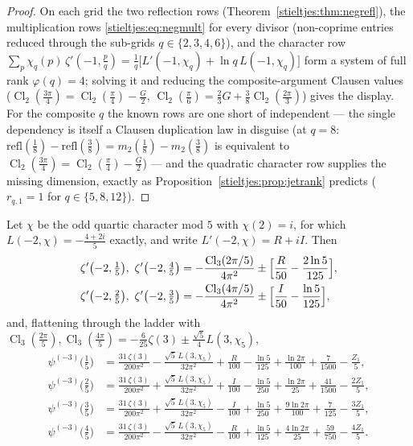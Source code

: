 \begin{proof}
On each grid the two reflection rows
(Theorem~\ref{stieltjes:thm:negrefl}), the multiplication rows
\eqref{stieltjes:eq:negmult} for every divisor (non-coprime entries
reduced through the sub-grids $q\in\{2,3,4,6\}$), and the character row
$\sum_p\chi_q(p)\,\zeta'(-1,\tfrac pq)
=\tfrac1q\bigl[L'(-1,\chi_q)+\ln q\,L(-1,\chi_q)\bigr]$ form a system of
full rank $\varphi(q)=4$; solving it and reducing the composite-argument
Clausen values
($\operatorname{Cl}_2(\tfrac{3\pi}4)=\operatorname{Cl}_2(\tfrac\pi4)-\tfrac G2$,
$\operatorname{Cl}_2(\tfrac\pi6)=\tfrac23G+\tfrac38\operatorname{Cl}_2(\tfrac{2\pi}3)$)
gives the display. For the composite $q$ the known rows are one short of
independent — the single dependency is itself a Clausen duplication law in
disguise (at $q=8$: $\mathrm{refl}(\tfrac18)-\mathrm{refl}(\tfrac38)
=m_2(\tfrac18)-m_2(\tfrac38)$ is equivalent to
$\operatorname{Cl}_2(\tfrac{3\pi}4)=\operatorname{Cl}_2(\tfrac\pi4)-\tfrac G2$)
— and the quadratic character row supplies the missing dimension, exactly
as Proposition~\ref{stieltjes:prop:jetrank} predicts ($r_{q,1}=1$ for
$q\in\{5,8,12\}$).
\end{proof}

\begin{theorem}[the quartic floor: $k=2$, $q=5$]\label{stieltjes:thm:negq5k2}
Let $\chi$ be the odd quartic character mod $5$ with $\chi(2)=i$, for
which $L(-2,\chi)=-\tfrac{4+2i}5$ exactly, and write
$L'(-2,\chi)=R+iI$. Then
\begin{align*}
\zeta'\bigl(-2,\tfrac15\bigr),\ \zeta'\bigl(-2,\tfrac45\bigr)
&=-\frac{\operatorname{Cl}_3(2\pi/5)}{4\pi^2}
\pm\Bigl[\frac R{50}-\frac{2\ln5}{125}\Bigr],\\
\zeta'\bigl(-2,\tfrac25\bigr),\ \zeta'\bigl(-2,\tfrac35\bigr)
&=-\frac{\operatorname{Cl}_3(4\pi/5)}{4\pi^2}
\pm\Bigl[\frac I{50}-\frac{\ln5}{125}\Bigr],
\end{align*}
and, flattening through the ladder with
$\operatorname{Cl}_3(\tfrac{2\pi}5),\operatorname{Cl}_3(\tfrac{4\pi}5)
=-\tfrac6{25}\zeta(3)\pm\tfrac{\sqrt5}4L(3,\chi_5)$,
\begin{align*}
\psi^{(-3)}\bigl(\tfrac15\bigr)
&=\frac{31\,\zeta(3)}{200\pi^2}-\frac{\sqrt5\,L(3,\chi_5)}{32\pi^2}
+\frac R{100}-\frac{\ln5}{125}+\frac{\ln2\pi}{100}+\frac7{1500}
-\frac{Z_1}5,\\
\psi^{(-3)}\bigl(\tfrac25\bigr)
&=\frac{31\,\zeta(3)}{200\pi^2}+\frac{\sqrt5\,L(3,\chi_5)}{32\pi^2}
+\frac I{100}-\frac{\ln5}{250}+\frac{\ln2\pi}{25}+\frac{41}{1500}
-\frac{2Z_1}5,\\
\psi^{(-3)}\bigl(\tfrac35\bigr)
&=\frac{31\,\zeta(3)}{200\pi^2}+\frac{\sqrt5\,L(3,\chi_5)}{32\pi^2}
-\frac I{100}+\frac{\ln5}{250}+\frac{9\ln2\pi}{100}+\frac7{125}
-\frac{3Z_1}5,\\
\psi^{(-3)}\bigl(\tfrac45\bigr)
&=\frac{31\,\zeta(3)}{200\pi^2}-\frac{\sqrt5\,L(3,\chi_5)}{32\pi^2}
-\frac R{100}+\frac{\ln5}{125}+\frac{4\ln2\pi}{25}+\frac{59}{750}
-\frac{4Z_1}5.
\end{align*}
\end{theorem}

